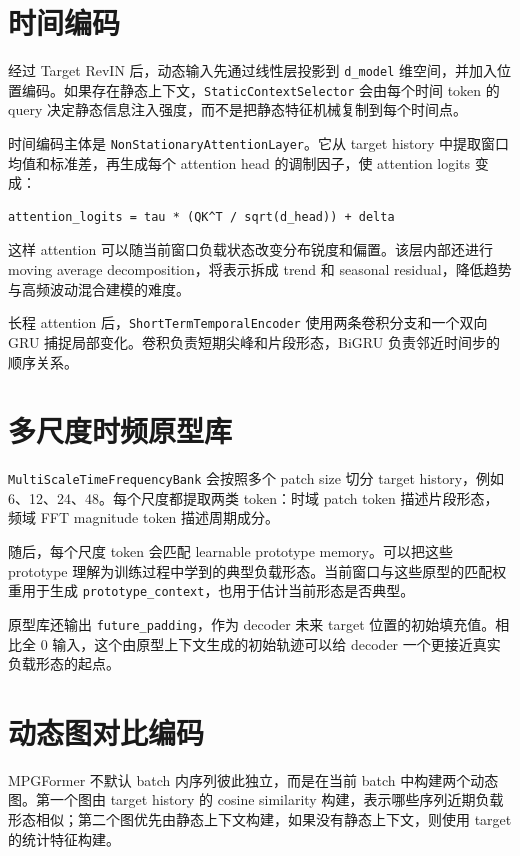 \documentclass[UTF8,a4paper,11pt]{ctexart}
\begin{document}
\section{时间编码}

经过 Target RevIN 后，动态输入先通过线性层投影到 \verb|d_model| 维空间，并加入位置编码。如果存在静态上下文，\verb|StaticContextSelector| 会由每个时间 token 的 query 决定静态信息注入强度，而不是把静态特征机械复制到每个时间点。

时间编码主体是 \verb|NonStationaryAttentionLayer|。它从 target history 中提取窗口均值和标准差，再生成每个 attention head 的调制因子，使 attention logits 变成：

\begin{lstlisting}
attention_logits = tau * (QK^T / sqrt(d_head)) + delta
\end{lstlisting}

这样 attention 可以随当前窗口负载状态改变分布锐度和偏置。该层内部还进行 moving average decomposition，将表示拆成 trend 和 seasonal residual，降低趋势与高频波动混合建模的难度。

长程 attention 后，\verb|ShortTermTemporalEncoder| 使用两条卷积分支和一个双向 GRU 捕捉局部变化。卷积负责短期尖峰和片段形态，BiGRU 负责邻近时间步的顺序关系。

\section{多尺度时频原型库}

\verb|MultiScaleTimeFrequencyBank| 会按照多个 patch size 切分 target history，例如 6、12、24、48。每个尺度都提取两类 token：时域 patch token 描述片段形态，频域 FFT magnitude token 描述周期成分。

随后，每个尺度 token 会匹配 learnable prototype memory。可以把这些 prototype 理解为训练过程中学到的典型负载形态。当前窗口与这些原型的匹配权重用于生成 \verb|prototype_context|，也用于估计当前形态是否典型。

原型库还输出 \verb|future_padding|，作为 decoder 未来 target 位置的初始填充值。相比全 0 输入，这个由原型上下文生成的初始轨迹可以给 decoder 一个更接近真实负载形态的起点。

\section{动态图对比编码}

MPGFormer 不默认 batch 内序列彼此独立，而是在当前 batch 中构建两个动态图。第一个图由 target history 的 cosine similarity 构建，表示哪些序列近期负载形态相似；第二个图优先由静态上下文构建，如果没有静态上下文，则使用 target 的统计特征构建。
\end{document}
